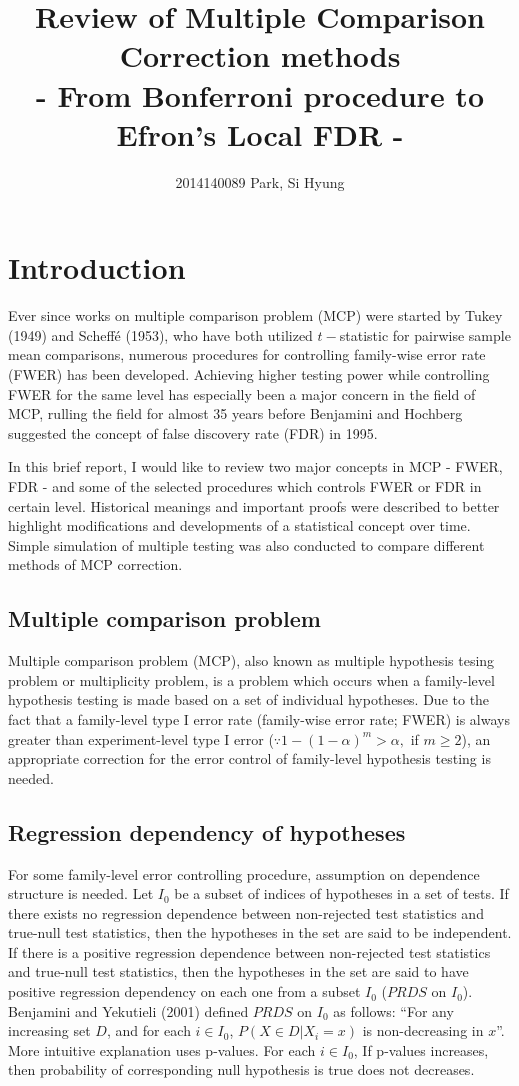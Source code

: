 \documentclass[a4paper, 11pt, oneside]{article}
\title{Review of Multiple Comparison Correction methods\\
	\Large - From Bonferroni procedure to Efron's Local FDR - }
\author{2014140089 Park, Si Hyung}
\date{}
\begin{document}
\maketitle

\section{Introduction}
\flushleft
    Ever since works on multiple comparison problem (MCP) were started by Tukey (1949) and Scheff\'e (1953), who have both utilized $t-$statistic for pairwise sample mean comparisons, numerous procedures for controlling family-wise error rate (FWER) has been developed. Achieving higher testing power while controlling FWER for the same level has especially been a major concern in the field of MCP, rulling the field for almost 35 years before Benjamini and Hochberg suggested the concept of false discovery rate (FDR) in 1995. \par
    In this brief report, I would like to review two major concepts in MCP - FWER, FDR - and some of the selected procedures which controls FWER or FDR in certain level. Historical meanings and important proofs were described to better highlight modifications and developments of a statistical concept over time. Simple simulation of multiple testing was also conducted to compare different methods of MCP correction.

\subsection{Multiple comparison problem}
Multiple comparison problem (MCP), also known as multiple hypothesis tesing problem or multiplicity problem, is a problem which occurs when a family-level hypothesis testing is made based on a set of individual hypotheses. Due to the fact that a family-level type I error rate (family-wise error rate; FWER) is always greater than experiment-level type I error ($\because 1-(1-\alpha)^m > \alpha,$ if $m \geq 2$), an appropriate correction for the error control of family-level hypothesis testing is needed.

\subsection{Regression dependency of hypotheses}
For some family-level error controlling procedure, assumption on dependence structure is needed. Let $I_0$ be a subset of indices of hypotheses in a set of tests. If there exists no regression dependence between non-rejected test statistics and true-null test statistics, then the hypotheses in the set are said to be independent. If there is a positive regression dependence between non-rejected test statistics and true-null test statistics, then the hypotheses in the set are said to have positive regression dependency on each one from a subset $I_0$ ($PRDS$ on $I_0$). Benjamini and Yekutieli (2001) defined $PRDS$ on $I_0$ as follows: \enquote{For any increasing set $D$, and for each $i \in I_0$, $P(X \in D | X_i = x)$ is non-decreasing in $x$}. More intuitive explanation uses p-values. For each $i \in I_0$, If p-values increases, then probability of corresponding null hypothesis is true does not decreases.
\end{document}
